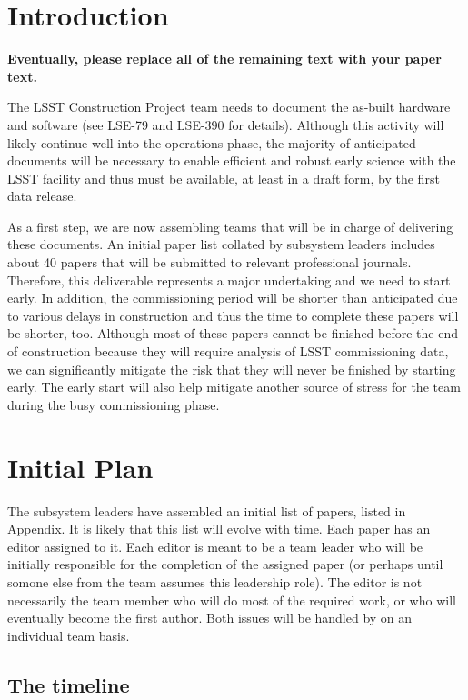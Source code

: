 \section{Introduction}

{\bf Eventually, please replace all of the remaining text with your paper text.}
\vskip 0.4in


The LSST Construction Project team needs to document the as-built hardware and software
(see LSE-79 and LSE-390 for details). Although this activity will likely continue well into the operations phase, the majority 
of anticipated documents will be necessary to enable efficient and robust early science with the LSST 
facility and thus must be available, at least in a draft form, by the first data release. 

As a first step, we are now assembling teams that will be in charge of delivering these documents.
An initial paper list collated by subsystem leaders includes about 40 papers that will be submitted 
to relevant professional journals. Therefore, this deliverable represents a major undertaking
and we need to start early. In addition, the commissioning period will be shorter than anticipated 
due to various delays in construction  and thus the time to complete these papers will be
shorter, too. Although most of these papers cannot be finished before the end of construction 
because they will require analysis of LSST commissioning data, we can significantly mitigate
the risk that they will never be finished by starting early. The early start will also help 
mitigate another source of stress for the team during the busy commissioning phase. 

 
\section{Initial Plan} 

The subsystem leaders have assembled an initial list of papers, listed in Appendix. 
It is likely that this list will evolve with time. 
Each paper has an editor assigned to it. Each editor is meant to be a team leader
who will be initially responsible for the completion of the assigned paper (or perhaps 
until somone else from the team assumes this leadership role). The editor is not 
necessarily the team member who will do most of the required work, or who will 
eventually become the first author. Both issues will be handled by on an individual team basis. 

\subsection{The timeline} 

